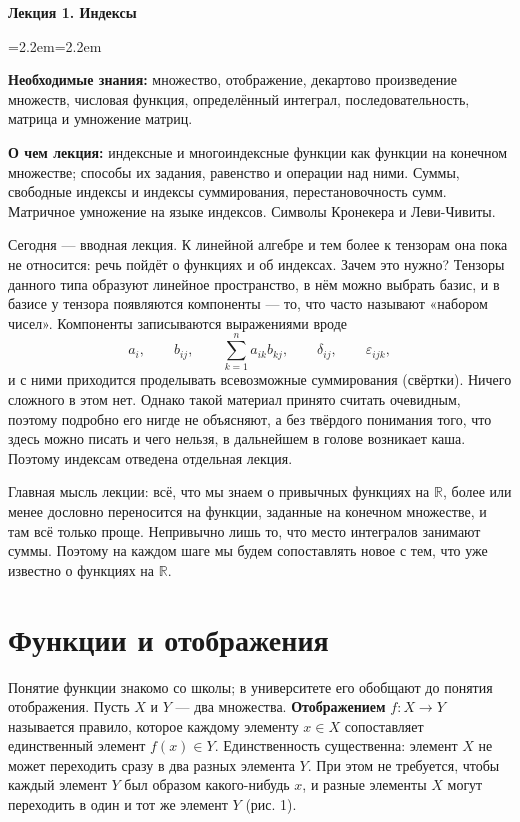 \documentclass[11pt,a4paper]{article}
\newenvironment{lectureabout}{\begin{list}{}{\leftmargin=2.2em\rightmargin=2.2em}\small\item[]}{\end{list}\medskip}
\begin{document}
\begin{center}
  {\Large\bfseries Лекция 1. Индексы}
\end{center}
\medskip

\begin{lectureabout}
\textbf{Необходимые знания:} множество, отображение, декартово произведение множеств, числовая функция, определённый интеграл, последовательность, матрица и умножение матриц.

\smallskip
\textbf{О чем лекция:} индексные и многоиндексные функции как функции на конечном множестве; способы их задания, равенство и операции над ними. Суммы, свободные индексы и индексы суммирования, перестановочность сумм. Матричное умножение на языке индексов. Символы Кронекера и Леви-Чивиты.
\end{lectureabout}

Сегодня — вводная лекция. К линейной алгебре и тем более к тензорам она пока не относится: речь пойдёт о функциях и об индексах. Зачем это нужно? Тензоры данного типа образуют линейное пространство, в нём можно выбрать базис, и в базисе у тензора появляются компоненты — то, что часто называют «набором чисел». Компоненты записываются выражениями вроде
\[
a_i, \qquad b_{ij}, \qquad \sum_{k=1}^{n} a_{ik} b_{kj}, \qquad \delta_{ij}, \qquad \varepsilon_{ijk},
\]
и с ними приходится проделывать всевозможные суммирования (свёртки). Ничего сложного в этом нет. Однако такой материал принято считать очевидным, поэтому подробно его нигде не объясняют, а без твёрдого понимания того, что здесь можно писать и чего нельзя, в дальнейшем в голове возникает каша. Поэтому индексам отведена отдельная лекция.

Главная мысль лекции: всё, что мы знаем о привычных функциях на $\mathbb{R}$, более или менее дословно переносится на функции, заданные на конечном множестве, и там всё только проще. Непривычно лишь то, что место интегралов занимают суммы. Поэтому на каждом шаге мы будем сопоставлять новое с тем, что уже известно о функциях на $\mathbb{R}$.

\section{Функции и отображения}

Понятие функции знакомо со школы; в университете его обобщают до понятия отображения. Пусть $X$ и $Y$ — два множества. \textbf{Отображением} $f\colon X \to Y$ называется правило, которое каждому элементу $x \in X$ сопоставляет единственный элемент $f(x) \in Y$. Единственность существенна: элемент $X$ не может переходить сразу в два разных элемента $Y$. При этом не требуется, чтобы каждый элемент $Y$ был образом какого-нибудь $x$, и разные элементы $X$ могут переходить в один и тот же элемент $Y$ (рис. 1).
\end{document}
